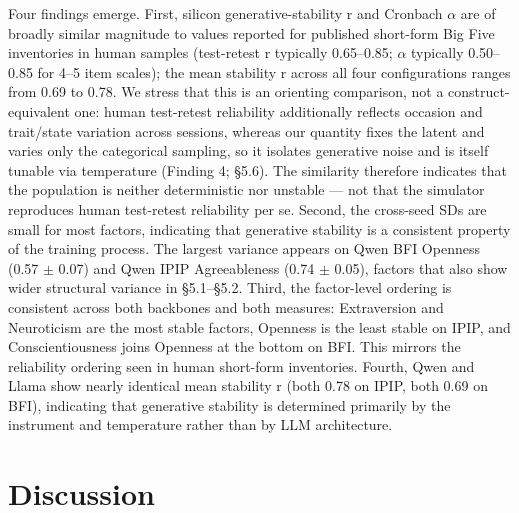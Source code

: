\documentclass[11pt]{article}
\begin{document}
Four findings emerge. First, silicon generative-stability r and Cronbach $\alpha$ are of broadly similar magnitude to values reported for published short-form Big Five inventories in human samples (test-retest r typically 0.65–0.85; $\alpha$ typically 0.50–0.85 for 4–5 item scales); the mean stability r across all four configurations ranges from 0.69 to 0.78. We stress that this is an orienting comparison, not a construct-equivalent one: human test-retest reliability additionally reflects occasion and trait/state variation across sessions, whereas our quantity fixes the latent and varies only the categorical sampling, so it isolates generative noise and is itself tunable via temperature (Finding 4; \S{}5.6). The similarity therefore indicates that the population is neither deterministic nor unstable — not that the simulator reproduces human test-retest reliability per se. Second, the cross-seed SDs are small for most factors, indicating that generative stability is a consistent property of the training process. The largest variance appears on Qwen BFI Openness (0.57 $\pm$ 0.07) and Qwen IPIP Agreeableness (0.74 $\pm$ 0.05), factors that also show wider structural variance in \S{}5.1–\S{}5.2. Third, the factor-level ordering is consistent across both backbones and both measures: Extraversion and Neuroticism are the most stable factors, Openness is the least stable on IPIP, and Conscientiousness joins Openness at the bottom on BFI. This mirrors the reliability ordering seen in human short-form inventories. Fourth, Qwen and Llama show nearly identical mean stability r (both 0.78 on IPIP, both 0.69 on BFI), indicating that generative stability is determined primarily by the instrument and temperature rather than by LLM architecture.


\section{Discussion}
\end{document}
